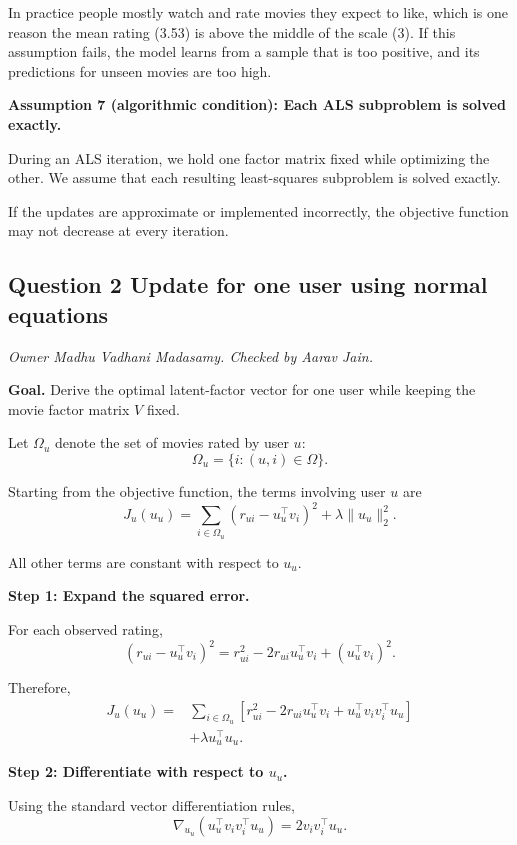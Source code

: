 In practice people mostly watch and rate movies they expect to
like, which is one reason the mean rating (3.53) is above the
middle of the scale (3). If
this assumption fails, the model learns from a sample that is
too positive, and its predictions for unseen movies are too high.

\textbf{Assumption 7 (algorithmic condition): Each ALS subproblem is solved exactly.}

During an ALS iteration, we hold one factor matrix fixed
while optimizing the other. We assume that each resulting
least-squares subproblem is solved exactly.

If the updates are approximate or implemented incorrectly,
the objective function may not decrease at every iteration.

\subsection*{Question 2 Update for one user using normal equations}
\textit{Owner Madhu Vadhani Madasamy. Checked by Aarav Jain.}

\textbf{Goal.} Derive the optimal latent-factor vector for
one user while keeping the movie factor matrix $V$ fixed.

Let $\Omega_u$ denote the set of movies rated by user $u$:
\[
\Omega_u=\{i:(u,i)\in\Omega\}.
\]

Starting from the objective function, the terms involving
user $u$ are
\[
J_u(u_u)=
\sum_{i\in\Omega_u}
(r_{ui}-u_u^\top v_i)^2
+\lambda\|u_u\|_2^2.
\]

All other terms are constant with respect to $u_u$.

\textbf{Step 1: Expand the squared error.}

For each observed rating,
\[
(r_{ui}-u_u^\top v_i)^2
=
r_{ui}^2-2r_{ui}u_u^\top v_i
+(u_u^\top v_i)^2.
\]

Therefore,
\[
\begin{aligned}
J_u(u_u)
={}&
\sum_{i\in\Omega_u}
\left[
r_{ui}^2-2r_{ui}u_u^\top v_i
+u_u^\top v_iv_i^\top u_u
\right]\\
&+\lambda u_u^\top u_u.
\end{aligned}
\]

\textbf{Step 2: Differentiate with respect to $u_u$.}

Using the standard vector differentiation rules,
\[
\nabla_{u_u}(u_u^\top v_iv_i^\top u_u)
=2v_iv_i^\top u_u.
\]

